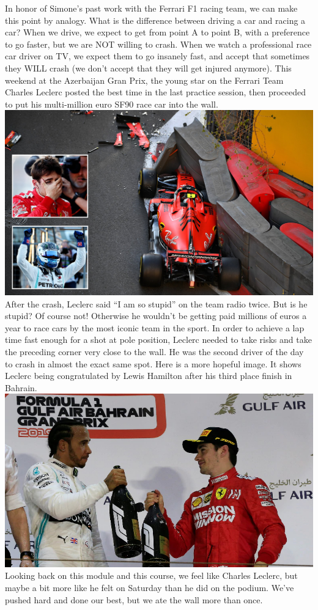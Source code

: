 \documentclass[11pt]{article} %
\begin{document}
			In honor of Simone's past work with the Ferrari F1 racing team, we can make this point by analogy.  
			What is the difference between driving a car and racing a car?
			When we drive, we expect to get from point A to point B, with a preference to go faster, but we are NOT willing to crash.
			When we watch a professional race car driver on TV, we expect them to go insanely fast, and accept that sometimes 
			they WILL crash (we don't accept that they will get injured anymore).
			This weekend at the Azerbaijan Gran Prix, the young star on the Ferrari Team Charles Leclerc 
			posted the best time in the last practice session, 
			then proceeded to put his multi-million euro SF90 race car into the wall. \\
			\includegraphics[width=1.00\textwidth]{pictures/charles_leclerc_crash.jpg}\\
			After the crash, Leclerc said ``I am so stupid'' on the team radio twice.
			But is he stupid? Of course not!  
			Otherwise he wouldn't be getting paid millions of euros a year to race cars
			by the most iconic team in the sport.
			In order to achieve a lap time fast enough for a shot at pole position, 
			Leclerc needed to take risks and take the preceding corner very close to the wall.
			He was the second driver of the day to crash in almost the exact same spot.
			Here is a more hopeful image.  
			It shows Leclerc being congratulated by Lewis Hamilton after his third place finish in Bahrain.\\
			\includegraphics[width=1.00\textwidth]{pictures/charles_leclerc_champagne.jpg}
			Looking back on this module and this course, we feel like Charles Leclerc, 
			but maybe a bit more like he felt on Saturday than he did on the podium.
			We've pushed hard and done our best, but we ate the wall more than once.
			
\end{document}
